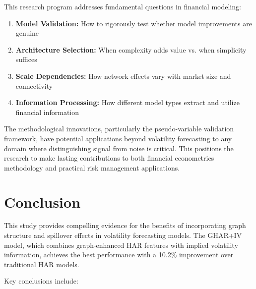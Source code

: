 \documentclass[12pt,a4paper]{article}
\begin{document}
This research program addresses fundamental questions in financial modeling:

\begin{enumerate}
\item \textbf{Model Validation:} How to rigorously test whether model improvements are genuine
\item \textbf{Architecture Selection:} When complexity adds value vs. when simplicity suffices  
\item \textbf{Scale Dependencies:} How network effects vary with market size and connectivity
\item \textbf{Information Processing:} How different model types extract and utilize financial information
\end{enumerate}

The methodological innovations, particularly the pseudo-variable validation framework, have potential applications beyond volatility forecasting to any domain where distinguishing signal from noise is critical. This positions the research to make lasting contributions to both financial econometrics methodology and practical risk management applications.

\section{Conclusion}

This study provides compelling evidence for the benefits of incorporating graph structure and spillover effects in volatility forecasting models. The GHAR+IV model, which combines graph-enhanced HAR features with implied volatility information, achieves the best performance with a 10.2\% improvement over traditional HAR models.

Key conclusions include:
\end{document}
